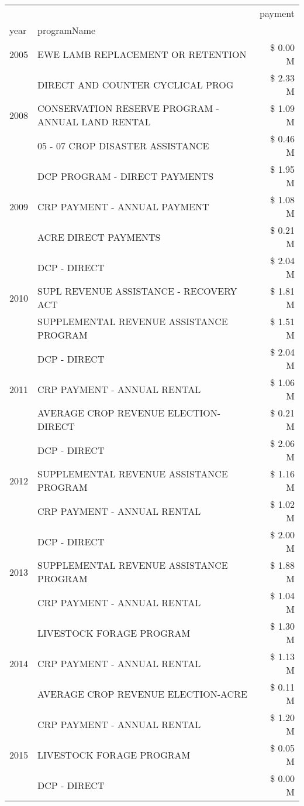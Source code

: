 \begin{tabular}{llr}
\toprule
 &  & payment \\
year & programName &  \\
\midrule
2005 & EWE LAMB REPLACEMENT OR RETENTION & \$ 0.00 M \\
\cline{1-3}
\multirow[t]{3}{*}{2008} & DIRECT AND COUNTER CYCLICAL PROG & \$ 2.33 M \\
 & CONSERVATION RESERVE PROGRAM - ANNUAL LAND RENTAL & \$ 1.09 M \\
 & 05 - 07 CROP DISASTER ASSISTANCE & \$ 0.46 M \\
\cline{1-3}
\multirow[t]{3}{*}{2009} & DCP PROGRAM - DIRECT PAYMENTS & \$ 1.95 M \\
 & CRP PAYMENT - ANNUAL PAYMENT & \$ 1.08 M \\
 & ACRE DIRECT PAYMENTS & \$ 0.21 M \\
\cline{1-3}
\multirow[t]{3}{*}{2010} & DCP - DIRECT & \$ 2.04 M \\
 & SUPL REVENUE ASSISTANCE - RECOVERY ACT & \$ 1.81 M \\
 & SUPPLEMENTAL REVENUE ASSISTANCE PROGRAM & \$ 1.51 M \\
\cline{1-3}
\multirow[t]{3}{*}{2011} & DCP - DIRECT & \$ 2.04 M \\
 & CRP PAYMENT - ANNUAL RENTAL & \$ 1.06 M \\
 & AVERAGE CROP REVENUE ELECTION-DIRECT & \$ 0.21 M \\
\cline{1-3}
\multirow[t]{3}{*}{2012} & DCP - DIRECT & \$ 2.06 M \\
 & SUPPLEMENTAL REVENUE ASSISTANCE PROGRAM & \$ 1.16 M \\
 & CRP PAYMENT - ANNUAL RENTAL & \$ 1.02 M \\
\cline{1-3}
\multirow[t]{3}{*}{2013} & DCP - DIRECT & \$ 2.00 M \\
 & SUPPLEMENTAL REVENUE ASSISTANCE PROGRAM & \$ 1.88 M \\
 & CRP PAYMENT - ANNUAL RENTAL & \$ 1.04 M \\
\cline{1-3}
\multirow[t]{3}{*}{2014} & LIVESTOCK FORAGE PROGRAM & \$ 1.30 M \\
 & CRP PAYMENT - ANNUAL RENTAL & \$ 1.13 M \\
 & AVERAGE CROP REVENUE ELECTION-ACRE & \$ 0.11 M \\
\cline{1-3}
\multirow[t]{3}{*}{2015} & CRP PAYMENT - ANNUAL RENTAL & \$ 1.20 M \\
 & LIVESTOCK FORAGE PROGRAM & \$ 0.05 M \\
 & DCP - DIRECT & \$ 0.00 M \\

\end{tabular}
